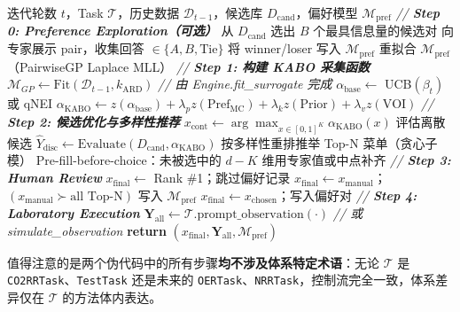\documentclass[12pt,a4paper]{article}
\begin{document}
\begin{algorithm}[H]
\caption{\textsc{InnerIteration}：单轮 KABO 迭代}
\label{alg:kabo-inner}
\begin{algorithmic}[1]
\REQUIRE 迭代轮数 $t$，Task $\mathcal{T}$，历史数据 $\mathcal{D}_{t-1}$，候选库 $D_{\text{cand}}$，偏好模型 $\mathcal{M}_{\text{pref}}$
\STATE \textit{// \textbf{Step 0: Preference Exploration（可选）}}
    \STATE 从 $D_{\text{cand}}$ 选出 $B$ 个最具信息量的候选对
        \STATE 向专家展示 pair，收集回答 $\in \{A, B, \text{Tie}\}$
            \STATE 将 winner/loser 写入 $\mathcal{M}_{\text{pref}}$
        \ENDIF
    \ENDFOR
    \STATE 重拟合 $\mathcal{M}_{\text{pref}}$（PairwiseGP Laplace MLL）
\ENDIF
\STATE \textit{// \textbf{Step 1: 构建 KABO 采集函数}}
\STATE $\mathcal{M}_{GP} \leftarrow \text{Fit}(\mathcal{D}_{t-1}, k_{\text{ARD}})$ \textit{// 由 Engine.fit\_surrogate 完成}
\STATE $\alpha_{\text{base}} \leftarrow$ UCB$(\beta_t)$ 或 qNEI
\STATE $\alpha_{\text{KABO}} \leftarrow z(\alpha_{\text{base}}) + \lambda_p z(\text{Pref}_{\text{MC}}) + \lambda_k z(\text{Prior}) + \lambda_v z(\text{VOI})$
\STATE \textit{// \textbf{Step 2: 候选优化与多样性推荐}}
\STATE $x_{\text{cont}} \leftarrow \arg\max_{x \in [0,1]^K} \alpha_{\text{KABO}}(x)$
\STATE 评估离散候选 $\hat{Y}_{\text{disc}} \leftarrow \text{Evaluate}(D_{\text{cand}}, \alpha_{\text{KABO}})$
\STATE 按多样性重排推举 Top-N 菜单（贪心子模）
\STATE Pre-fill-before-choice：未被选中的 $d-K$ 维用专家值或中点补齐
\STATE \textit{// \textbf{Step 3: Human Review}}
    \STATE $x_{\text{final}} \leftarrow$ Rank \#1；跳过偏好记录
    \STATE $x_{\text{final}} \leftarrow x_{\text{manual}}$；$(x_{\text{manual}} \succ \text{all Top-N})$ 写入 $\mathcal{M}_{\text{pref}}$
\ELSE
    \STATE $x_{\text{final}} \leftarrow x_{\text{chosen}}$；写入偏好对
\ENDIF
\STATE \textit{// \textbf{Step 4: Laboratory Execution}}
\STATE $\mathbf{Y}_{\text{all}} \leftarrow \mathcal{T}.\text{prompt\_observation}(\cdot)$ \textit{// 或 simulate\_observation}
\STATE \textbf{return} $(x_{\text{final}}, \mathbf{Y}_{\text{all}}, \mathcal{M}_{\text{pref}})$
\end{algorithmic}
\end{algorithm}

值得注意的是两个伪代码中的所有步骤\textbf{均不涉及体系特定术语}：无论 $\mathcal{T}$ 是 \texttt{CO2RRTask}、\texttt{TestTask} 还是未来的 \texttt{OERTask}、\texttt{NRRTask}，控制流完全一致，体系差异仅在 $\mathcal{T}$ 的方法体内表达。
\end{document}
